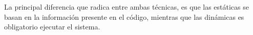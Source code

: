 La principal diferencia que radica entre ambas técnicas,  es que las estáticas se basan en la información presente en el código, mientras que las dinámicas es obligatorio ejecutar el sistema.









 
